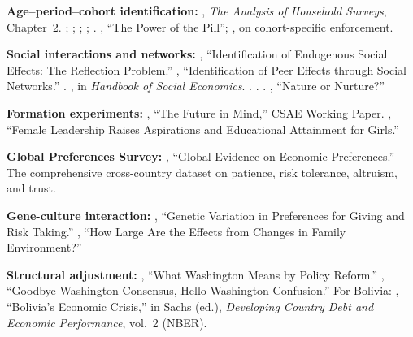 \documentclass[../structural_economics_book.tex]{subfiles}
\begin{document}
\textbf{Age--period--cohort identification:} \citet{deaton1997analysis}, \textit{The Analysis of Household Surveys}, Chapter~2. \citet{hall1971measurement}; \citet{heckman1985using}; \citet{deaton1994saving}; \citet{mckenzie2006disentangling}; \citet{fosse2019analyzing}. \citet{goldin2002power}, ``The Power of the Pill''; \citet{bailey2006more}, on cohort-specific enforcement.

\textbf{Social interactions and networks:} \citet{manski1993identification}, ``Identification of Endogenous Social Effects: The Reflection Problem.'' \citet{bramoulle2009identification}, ``Identification of Peer Effects through Social Networks.'' \citet{lee2007identification}. \citet{blume2011identification}, in \textit{Handbook of Social Economics}. \citet{goldsmithpinkham2013social}. \citet{breza2020using}. \citet{bursztyn2014understanding}. \citet{fogli2011nature}, ``Nature or Nurture?''

\textbf{Formation experiments:} \citet{bernard2014future}, ``The Future in Mind,'' CSAE Working Paper. \citet{beaman2012female}, ``Female Leadership Raises Aspirations and Educational Attainment for Girls.''

\textbf{Global Preferences Survey:} \citet{falk2018global}, ``Global Evidence on Economic Preferences.'' The comprehensive cross-country dataset on patience, risk tolerance, altruism, and trust.

\textbf{Gene-culture interaction:} \citet{cesarini2009genetic}, ``Genetic Variation in Preferences for Giving and Risk Taking.'' \citet{sacerdote2007how}, ``How Large Are the Effects from Changes in Family Environment?''

\textbf{Structural adjustment:} \citet{williamson1990what}, ``What Washington Means by Policy Reform.'' \citet{rodrik2006goodbye}, ``Goodbye Washington Consensus, Hello Washington Confusion.'' For Bolivia: \citet{morales1990bolivias}, ``Bolivia's Economic Crisis,'' in Sachs (ed.), \textit{Developing Country Debt and Economic Performance}, vol.~2 (NBER).
\end{document}
